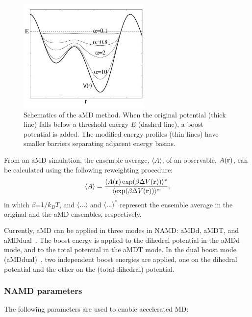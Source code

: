 \begin{figure}[!ht]
  \centering
  \includegraphics[width=6.5cm]{figures/amd_schematic.jpg}
  \caption{Schematics of the aMD method. When the original potential (thick line) falls below a threshold energy $E$ (dashed line),
          a boost potential is added. The modified energy profiles (thin lines) have smaller barriers separating adjacent
	  energy basins. 
	  }
  \label{fig:amd_schematic}
\end{figure}
From an aMD simulation, the ensemble average, $\langle A \rangle$, of an observable, $A({\bf r})$, can be calculated
using the following reweighting procedure:
\begin{equation}
\langle A \rangle =\frac{\langle A({\bf r})\,\text{exp} (\beta \Delta V({\bf r})) \rangle^* }
{\langle \text{exp}  (\beta \Delta V({\bf r})) \rangle^*},
\end{equation}
in which $\beta$=$1/k_BT$, and $\langle ... \rangle$ and $\langle...\rangle^*$ represent 
the ensemble average in the original and the aMD ensembles, respectively. 

Currently, aMD can be applied in three modes in NAMD: aMDd, aMDT, and aMDdual~\cite{WANG2011mc}. The boost energy
is applied to the dihedral potential in the aMDd mode, and to the total potential in the aMDT mode.
In the dual boost mode (aMDdual)~\cite{HAME2007mc}, two independent boost energies are applied, one on the dihedral potential and the other
on the (total-dihedral) potential.

\subsubsection{NAMD parameters}

The following parameters are used to enable accelerated MD:

